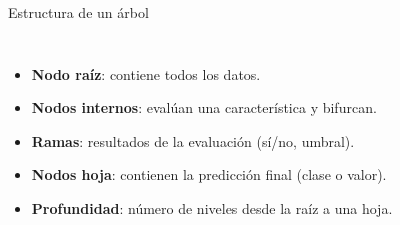 \documentclass[aspectratio=169, 10pt, xcolor=table]{beamer}
\begin{document}
\begin{frame}{Estructura de un árbol}
    \begin{columns}[t]
        \begin{itemize}
            \item \textbf{Nodo raíz}: contiene todos los datos.
            \item \textbf{Nodos internos}: evalúan una característica y bifurcan.
            \item \textbf{Ramas}: resultados de la evaluación (sí/no, umbral).
            \item \textbf{Nodos hoja}: contienen la predicción final (clase o valor).
            \item \textbf{Profundidad}: número de niveles desde la raíz a una hoja.
        \end{itemize}
        \begin{center}
        \end{center}
    \end{columns}
\end{frame}
\end{document}
